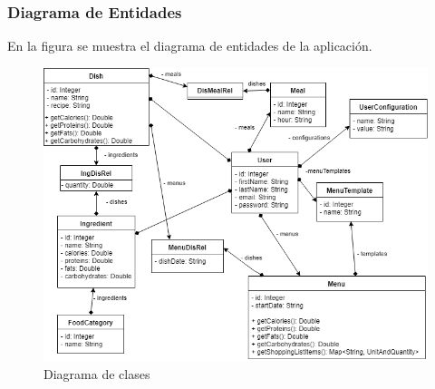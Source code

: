 \documentclass[12pt, a4paper, twoside]{book}
\begin{document}
	\subsubsection{Diagrama de Entidades}
	En la figura se muestra el diagrama de entidades de la aplicación.
	\begin{figure}[H]
		\centering
		\includegraphics[width=15cm]{Imagenes/DiagramaClases.png}
		\caption{Diagrama de clases}\label{Diagrama de clases}
	\end{figure}
\end{document}
